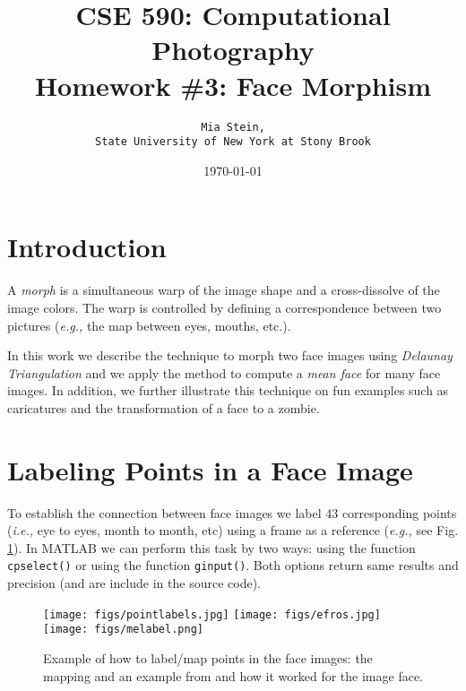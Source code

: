 \documentclass[11pt]{article}
\title{CSE 590: Computational Photography\\  Homework \#3: Face Morphism }
\author{ \texttt{ Mia Stein,  }\\
	   \texttt{State University of New York at Stony Brook}}
\date{\today}
\newcommand{\ie}{{\it i.e., }}
\newcommand{\eg}{{\it e.g., }}
\begin{document}
\maketitle
{}  




\section{Introduction}


A {\it morph} is a simultaneous warp of the image shape and a cross-dissolve of the image colors. The warp is controlled by defining a correspondence between two pictures (\eg the map between eyes, mouths, etc.). 


\quad

In this work we describe the technique to morph two face images using {\it Delaunay Triangulation} and we apply the method to compute a {\it mean face} for many face images. In addition, we further illustrate this technique on fun examples such as caricatures and the transformation of a face to a zombie.

\newpage




\section{Labeling Points in a Face Image}

To establish the connection between face images we label 43 corresponding points (\ie eye to eyes, month to month, etc) using a frame as a reference (\eg see Fig. \ref{pointslabel}). In MATLAB we can perform this task by two ways: using the function \texttt{cpselect()} or using the function \texttt{ginput()}. Both options return same results and precision (and are include in the  source code).


\quad

\begin{figure} [ht]
\begin{center}
\texttt{[image: figs/pointlabels.jpg]}  
\texttt{[image: figs/efros.jpg]}  
\texttt{[image: figs/melabel.png]}  
\caption{Example of how to label/map points in the face images: the mapping and an example from  \cite{tamara} and how it worked for the image face.}
\label{pointslabel}
\end{center}
\end{figure}


\newpage
\end{document}

